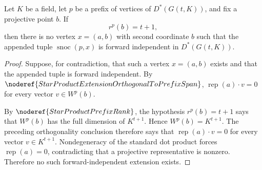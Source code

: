 \begin{helper}
Let \(K\) be a field, let \(p\) be a prefix of vertices of
\(D^*(G(t,K))\), and fix a projective point \(b\).  If
\[
  r^p(b)=t+1,
\]
then there is no vertex \(x=(a,b)\) with second coordinate \(b\) such that
the appended tuple \(\operatorname{snoc}(p,x)\) is forward independent in
\(D^*(G(t,K))\).
\end{helper}
\begin{proof}
Suppose, for contradiction, that such a vertex \(x=(a,b)\) exists and that
the appended tuple is forward independent.  By
\(\noderef{StarProductExtensionOrthogonalToPrefixSpan}\),
\(\operatorname{rep}(a)\cdot v=0\) for every vector \(v\in W^p(b)\).

By \(\noderef{StarProductPrefixRank}\), the hypothesis \(r^p(b)=t+1\) says
that \(W^p(b)\) has the full dimension of \(K^{t+1}\).  Hence
\(W^p(b)=K^{t+1}\).  The preceding orthogonality conclusion therefore says
that \(\operatorname{rep}(a)\cdot v=0\) for every vector
\(v\in K^{t+1}\).  Nondegeneracy of the standard dot product forces
\(\operatorname{rep}(a)=0\), contradicting that a projective representative
is nonzero.  Therefore no such forward-independent extension exists.
\end{proof}

